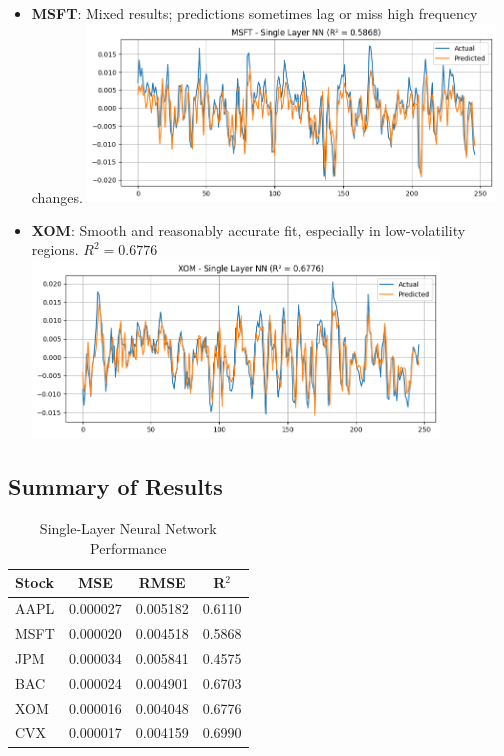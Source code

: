 \documentclass[12pt]{article}
\begin{document}
\begin{itemize}
  \item \textbf{MSFT}: Mixed results; predictions sometimes lag or miss high frequency changes.
  \includegraphics[width=0.85\textwidth]{MSFT_single_layer_nn.png}

  \item \textbf{XOM}: Smooth and reasonably accurate fit, especially in low-volatility regions. $R^2 = 0.6776$
  \includegraphics[width=0.85\textwidth]{XOM_single_layer_nn.png}
\end{itemize}

\subsection{Summary of Results}
\begin{table}[h!]
\centering
\begin{tabular}{lccc}
\toprule
\textbf{Stock} & \textbf{MSE} & \textbf{RMSE} & \textbf{R$^2$} \\
\midrule
AAPL & 0.000027 & 0.005182 & 0.6110 \\
MSFT & 0.000020 & 0.004518 & 0.5868 \\
JPM  & 0.000034 & 0.005841 & 0.4575 \\
BAC  & 0.000024 & 0.004901 & 0.6703 \\
XOM  & 0.000016 & 0.004048 & 0.6776 \\
CVX  & 0.000017 & 0.004159 & 0.6990 \\
\bottomrule
\end{tabular}
\caption{Single-Layer Neural Network Performance}
\end{table}
\end{document}
